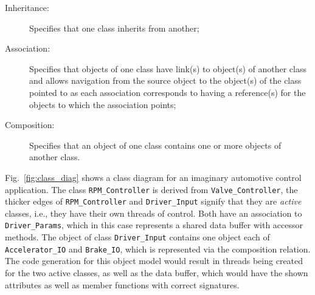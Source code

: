 \begin{description}
\item[Inheritance:]{Specifies that one class inherits from another;}
\item[Association:]{Specifies that objects of one class have link(s)
  to object(s) of another class and allows navigation from the source
  object to the object(s) of the class pointed to as each association
  corresponds to having a reference(s) for the objects to which the
  association points;}
\item[Composition:]{Specifies that an object of one class contains one
  or more objects of another class.}
\end{description}

Fig.~\ref{fig:class_diag} shows a class diagram for an imaginary
automotive control application. The class \texttt{RPM\_Controller} is
derived from \texttt{Valve\_Controller}, the thicker edges of
\texttt{RPM\_Controller} and \texttt{Driver\_Input} signify that they
are \emph{active} classes, i.e., they have their own threads of
control. Both have an association to \texttt{Driver\_Params}, which in
this case represents a shared data buffer with accessor methods. The
object of class \texttt{Driver\_Input} contains one object each of
\texttt{Accelerator\_IO} and \texttt{Brake\_IO}, which is represented
via the composition relation. The code generation for this object
model would result in threads being created for the two active
classes, as well as the data buffer, which would have the shown
attributes as well as member functions with correct signatures.

